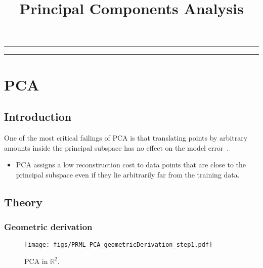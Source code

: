 
\title{Principal Components Analysis}
\date{}

\maketitle
\rule[0pt]{\textwidth}{1pt}
\tableofcontents
\rule[0pt]{\textwidth}{1pt}

\section{PCA}
\subsection{Introduction}

One of the most critical failings of PCA is that translating points by arbitrary amounts inside the principal subspace has no effect on the model error~\cite{1999_JNL_Gaussian_roweis}.


\begin{itemize}
\item PCA assigns a low reconstruction cost to data points that are close to the principal subspace even if they lie arbitrarily far from the training data.
\end{itemize}

\subsection{Theory}

\subsubsection{Geometric derivation}


                \begin{figure}
                \centering
                \texttt{[image: figs/PRML\_PCA\_geometricDerivation\_step1.pdf]}
                \caption{PCA in $\mathbb{R}^2$.} 
                \label{fig:PCA_geometric1}
                \end{figure}



